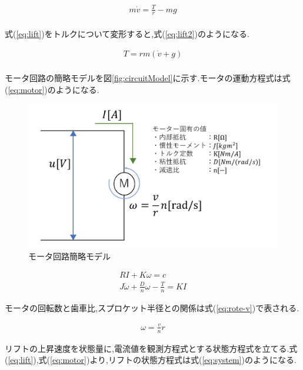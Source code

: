 \begin{eqnarray}
m\dot{v}=\frac{T}{r}-mg\\
\label{eq:lift}
\end{eqnarray}

式(\ref{eq:lift})をトルクについて変形すると,式(\ref{eq:lift2})のようになる.

\begin{eqnarray}
T=rm(\dot{v}+g)\\
\label{eq:lift2}
\end{eqnarray}

モータ回路の簡略モデルを図\ref{fig:circuitModel}に示す.モータの運動方程式は式(\ref{eq:motor})のようになる.

\begin{figure}[htbp]
  \begin{center}
    \includegraphics[width=150mm]{img/circuitmodel.png}
    \end{center}
  \caption{モータ回路簡略モデル}
 \label{fig:circuitmodel}
\end{figure}

\begin{eqnarray}
RI+K{\omega}=c\\
J\dot{\omega}+\frac{D}{n}{\omega}-\frac{T}{n}=KI
\label{eq:motor}
\end{eqnarray}

モータの回転数と歯車比,スプロケット半径との関係は式(\ref{eq:rote-v})で表される.

\begin{eqnarray}
{\omega}=\frac{v}{n}r
\label{eq:rote-v}
\end{eqnarray}

リフトの上昇速度を状態量に,電流値を観測方程式とする状態方程式を立てる.式(\ref{eq:lift}),式(\ref{eq:motor})より,リフトの状態方程式は式(\ref{eq:system})のようになる.

